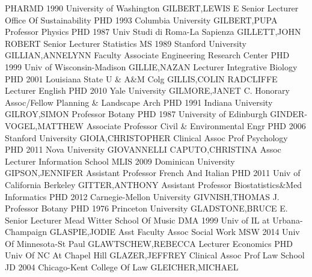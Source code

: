 \documentclass[
]{article}
\begin{document}
\textbar PHARMD 1990 University of Washington \textbar GILBERT,LEWIS E
\textbar Senior Lecturer \textbar Office Of Sustainability \textbar{}
 \textbar PHD 1993 Columbia University \textbar GILBERT,PUPA
\textbar Professor \textbar Physics \textbar{}  \textbar PHD
1987 Univ Studi di Roma-La Sapienza \textbar GILLETT,JOHN ROBERT
\textbar Senior Lecturer \textbar Statistics \textbar{} 
\textbar MS 1989 Stanford University \textbar GILLIAN,ANNELYNN
\textbar Faculty Associate \textbar Engineering Research Center
\textbar{}  \textbar PHD 1999 Univ of Wisconsin-Madison
\textbar GILLIE,NAZAN \textbar Lecturer \textbar Integrative Biology
\textbar{}  \textbar PHD 2001 Louisiana State U \& A\&M Colg
\textbar GILLIS,COLIN RADCLIFFE \textbar Lecturer \textbar English
\textbar{}  \textbar PHD 2010 Yale University
\textbar GILMORE,JANET C. \textbar Honorary Assoc/Fellow
\textbar Planning \& Landscape Arch \textbar{}  \textbar PHD
1991 Indiana University \textbar GILROY,SIMON \textbar Professor
\textbar Botany \textbar{}  \textbar PHD 1987 University of
Edinburgh \textbar GINDER-VOGEL,MATTHEW \textbar Associate Professor
\textbar Civil \& Environmental Engr \textbar{} 
\textbar PHD 2006 Stanford University \textbar GIOIA,CHRISTOPHER
\textbar Clinical Assoc Prof \textbar Psychology \textbar{} 
\textbar PHD 2011 Nova University \textbar GIOVANNELLI CAPUTO,CHRISTINA
\textbar Assoc Lecturer \textbar Information School \textbar{}
 \textbar MLIS 2009 Dominican University
\textbar GIPSON,JENNIFER \textbar Assistant Professor \textbar French
And Italian \textbar{}  \textbar PHD 2011 Univ of California
Berkeley \textbar GITTER,ANTHONY \textbar Assistant Professor
\textbar Biostatistics\&Med Informatics \textbar{} 
\textbar PHD 2012 Carnegie-Mellon University \textbar GIVNISH,THOMAS J.
\textbar Professor \textbar Botany \textbar{}  \textbar PHD
1976 Princeton University \textbar GLADSTONE,BRUCE E. \textbar Senior
Lecturer \textbar Mead Witter School Of Music \textbar{} 
\textbar DMA 1999 Univ of IL at Urbana-Champaign \textbar GLASPIE,JODIE
\textbar Asst Faculty Assoc \textbar Social Work \textbar{} 
\textbar MSW 2014 Univ Of Minnesota-St Paul \textbar GLAWTSCHEW,REBECCA
\textbar Lecturer \textbar Economics \textbar{} 
\textbar PHD Univ Of NC At Chapel Hill \textbar GLAZER,JEFFREY
\textbar Clinical Assoc Prof \textbar Law School \textbar{} 
\textbar JD 2004 Chicago-Kent College Of Law \textbar GLEICHER,MICHAEL
\end{document}
